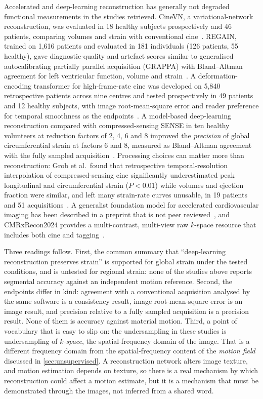 Accelerated and deep-learning reconstruction has generally not degraded functional measurements in
the studies retrieved. CineVN, a variational-network reconstruction, was evaluated in 18 healthy
subjects prospectively and 46 patients, comparing volumes and strain with conventional
cine~\citep{vornehm2025cinevn}. REGAIN, trained on 1,616 patients and evaluated in 181 individuals
(126 patients, 55 healthy), gave diagnostic-quality and artefact scores similar to generalised
autocalibrating partially parallel acquisition (GRAPPA) with
Bland--Altman agreement for left ventricular function, volume and strain~\citep{yoon2023regain}. A
deformation-encoding transformer for high-frame-rate cine was developed on 5,840 retrospective
patients across nine centres and tested prospectively in 49 patients and 12 healthy subjects, with
image root-mean-square error and reader preference for temporal smoothness as the
endpoints~\citep{morales2024dent}. A model-based deep-learning reconstruction compared with
compressed-sensing SENSE in ten healthy volunteers at reduction factors of 2, 4, 6 and 8 improved
the \emph{precision} of global circumferential strain at factors 6 and 8, measured as Bland--Altman
agreement with the fully sampled acquisition~\citep{tsuneta2025dlr}. Processing choices can matter
more than reconstruction: Grob et al.\ found that retrospective temporal-resolution interpolation of
compressed-sensing cine significantly underestimated peak longitudinal and circumferential strain
($P<0.01$) while volumes and ejection fraction were similar, and left many strain-rate curves
unusable, in 19 patients and 51 acquisitions~\citep{grob2025}. A generalist foundation model for
accelerated cardiovascular imaging has been described in a preprint that is not peer
reviewed~\citep{wang2026cardiomm}, and CMRxRecon2024 provides a multi-contrast, multi-view raw
$k$-space resource that includes both cine and tagging~\citep{wang2025cmrxrecon2024}.

Three readings follow. First, the common summary that \enquote{deep-learning reconstruction
preserves strain} is supported for global strain under the tested conditions, and is untested for
regional strain: none of the studies above reports segmental accuracy against an independent motion
reference. Second, the endpoints differ in kind: agreement with a conventional acquisition
analysed by the same software is a consistency result, image root-mean-square error is an image
result, and precision relative to a fully sampled acquisition is a precision result. None of them
is accuracy against material motion. Third, a point of vocabulary that is easy to slip on: the
undersampling in these studies is undersampling of \emph{$k$-space}, the spatial-frequency domain of
the image. That is a different frequency domain from the spatial-frequency content of the
\emph{motion field} discussed in \cref{sec:unsupervised}. A reconstruction network alters image
texture, and motion estimation depends on texture, so there is a real mechanism by which
reconstruction could affect a motion estimate, but it is a mechanism that must be demonstrated
through the images, not inferred from a shared word.

